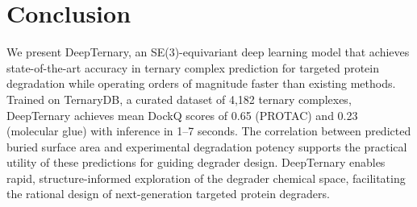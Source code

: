 \documentclass[11pt]{article}
\begin{document}
\section{Conclusion}

We present DeepTernary, an SE(3)-equivariant deep learning model that achieves state-of-the-art accuracy in ternary complex prediction for targeted protein degradation while operating orders of magnitude faster than existing methods. Trained on TernaryDB, a curated dataset of 4,182 ternary complexes, DeepTernary achieves mean DockQ scores of 0.65 (PROTAC) and 0.23 (molecular glue) with inference in 1--7 seconds. The correlation between predicted buried surface area and experimental degradation potency supports the practical utility of these predictions for guiding degrader design. DeepTernary enables rapid, structure-informed exploration of the degrader chemical space, facilitating the rational design of next-generation targeted protein degraders.



\end{document}
